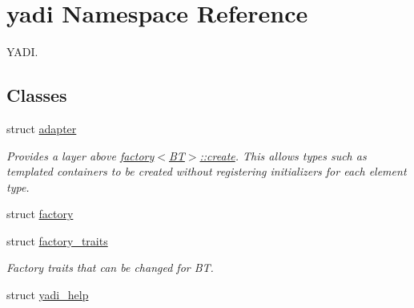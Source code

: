 \hypertarget{namespaceyadi}{}\section{yadi Namespace Reference}
\label{namespaceyadi}


Y\+A\+DI.  


\subsection*{Classes}
\begin{DoxyCompactItemize}
\item 
struct \hyperlink{structyadi_1_1adapter}{adapter}
\begin{DoxyCompactList}\small\item\em Provides a layer above \hyperlink{structyadi_1_1factory_a600474900d2c6fa5d09935a641298bd5}{factory$<$\+B\+T$>$\+::create}. This allows types such as templated containers to be created without registering initializers for each element type. \end{DoxyCompactList}\item 
struct \hyperlink{structyadi_1_1factory}{factory}
\item 
struct \hyperlink{structyadi_1_1factory__traits}{factory\+\_\+traits}
\begin{DoxyCompactList}\small\item\em Factory traits that can be changed for BT. \end{DoxyCompactList}\item 
struct \hyperlink{structyadi_1_1yadi__help}{yadi\+\_\+help}
\end{DoxyCompactItemize}
